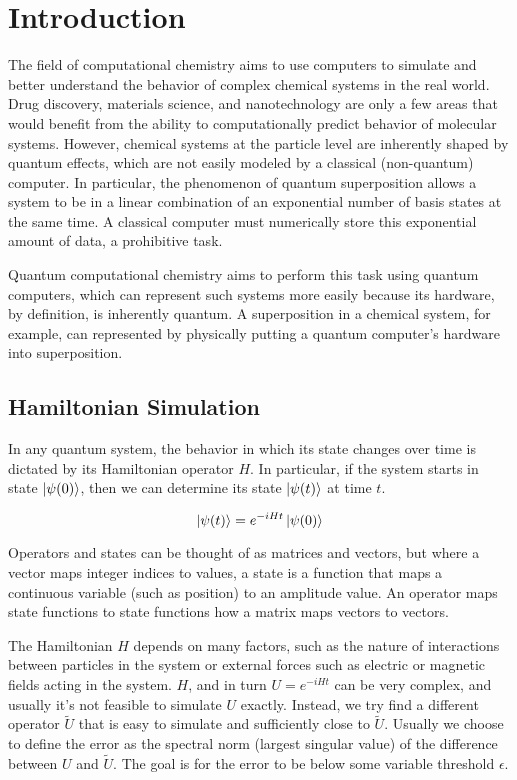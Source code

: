 

\chapter{Introduction}

The field of computational chemistry aims to use computers to simulate and better understand the behavior of complex chemical systems in the real world. Drug discovery, materials science, and nanotechnology are only a few areas that would benefit from the ability to computationally predict behavior of molecular systems. However, chemical systems at the particle level are inherently shaped by quantum effects, which are not easily modeled by a classical (non-quantum) computer. In particular, the phenomenon of quantum superposition allows a system to be in a linear combination of an exponential number of basis states at the same time. A classical computer must numerically store this exponential amount of data, a prohibitive task.

Quantum computational chemistry aims to perform this task using quantum computers, which can represent such systems more easily because its hardware, by definition, is inherently quantum. A superposition in a chemical system, for example, can represented by physically putting a quantum computer's hardware into superposition.

\section{Hamiltonian Simulation}

In any quantum system, the behavior in which its state changes over time is dictated by its Hamiltonian operator $H$. In particular, if the system starts in state $\ket{\psi(0)}$, then we can determine its state $\ket{\psi(t)}$ at time $t$.

\begin{equation}
    \ket{\psi(t)} = e^{-iHt}\ket{\psi(0)}
\end{equation}

Operators and states can be thought of as matrices and vectors, but where a vector maps integer indices to values, a state is a function that maps a continuous variable (such as position) to an amplitude value. An operator maps state functions to state functions how a matrix maps vectors to vectors.

The Hamiltonian $H$ depends on many factors, such as the nature of interactions between particles in the system or external forces such as electric or magnetic fields acting in the system. $H$, and in turn $U = e^{-iHt}$ can be very complex, and usually it's not feasible to simulate $U$ exactly. Instead, we try find a different operator $\tilde{U}$ that is easy to simulate and sufficiently close to $\tilde{U}$. Usually we choose to define the error as the spectral norm (largest singular value) of the difference between $U$ and $\tilde{U}$. The goal is for the error to be below some variable threshold $\epsilon$.

